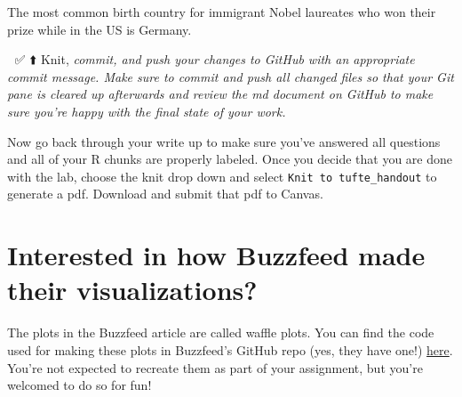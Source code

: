 \documentclass[
]{article}
\begin{document}
The most common birth country for immigrant Nobel laureates who won
their prize while in the US is Germany.

🧶 ✅ ⬆️ Knit, \emph{commit, and push your changes to GitHub with an
appropriate commit message. Make sure to commit and push all changed
files so that your Git pane is cleared up afterwards and review the md
document on GitHub to make sure you're happy with the final state of
your work.}

Now go back through your write up to make sure you've answered all
questions and all of your R chunks are properly labeled. Once you decide
that you are done with the lab, choose the knit drop down and select
\texttt{Knit\ to\ tufte\_handout} to generate a pdf. Download and submit
that pdf to Canvas.

\section{Interested in how Buzzfeed made their
visualizations?}\label{interested-in-how-buzzfeed-made-their-visualizations}

The plots in the Buzzfeed article are called waffle plots. You can find
the code used for making these plots in Buzzfeed's GitHub repo (yes,
they have one!)
\href{https://buzzfeednews.github.io/2017-01-immigration-and-science/}{here}.
You're not expected to recreate them as part of your assignment, but
you're welcomed to do so for fun!
\end{document}
